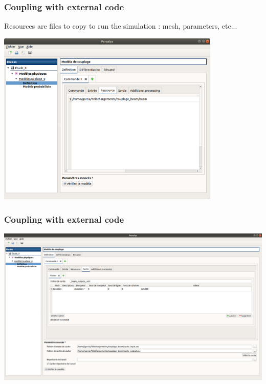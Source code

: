 \documentclass{beamer}
\begin{document}

\begin{frame}
\frametitle{Coupling with external code}

Resources are files to copy to run the simulation : mesh, parameters, etc...

\begin{center}
\includegraphics[width=0.8\textwidth]{figures/coupling-3-Ressource.png}
\end{center}

\end{frame}


\begin{frame}
\frametitle{Coupling with external code}

\begin{center}
\includegraphics[width=1.0\textwidth]{figures/coupling-4-sortie.png}
\end{center}

\end{frame}
\end{document}
